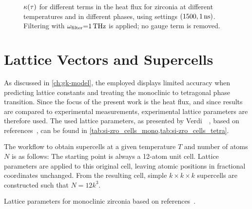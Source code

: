 \clearpage
\begin{figure}
  \centering



  \caption{
  $\kappa(\tau)$ for different terms in the heat flux
  for zirconia at different temperatures and in different phases,
  using  settings $(1500, \qty{1}{ns})$.
  Filtering with $\omega_{\text{filter}}{=}\qty{1}{THz}$ is applied; no gauge term is removed.
  }
  \label{fig:si-gkc_convective_converged}
\end{figure}


\clearpage
\section{Lattice Vectors and Supercells}
\label{sec:si-gknet_zro_lattice}

As discussed in \cref{ch:gk-model}, the employed \mlp displays limited accuracy when predicting lattice constants and treating the monoclinic to tetragonal phase transition.
Since the focus of the present work is the heat flux, and since results are compared to experimental measurements, experimental lattice parameters are therefore used.
The used lattice parameters, as presented by Verdi~\etal{}~\cite{vkjk2021q}, based on references~\cite{ps1969t,kh1998t}, can be found in \cref{tab:si-zro_cells_mono,tab:si-zro_cells_tetra}.

The workflow to obtain supercells at a given temperature $T$ and number of atoms $N$ is as follows: The starting point is always a 12-atom unit cell. Lattice parameters are applied to this original cell, leaving atomic positions in fractional coordinates unchanged. From the resulting cell, simple $k \times k \times k$ supercells are constructed such that $N = 12 k^3$.

\vspace{2\baselineskip}

\begin{table}
    \caption{Lattice parameters for monoclinic zirconia based on references~\cite{ps1969t,kh1998t,vkjk2021q}.}
	
    \label{tab:si-zro_cells_mono}
\end{table}

